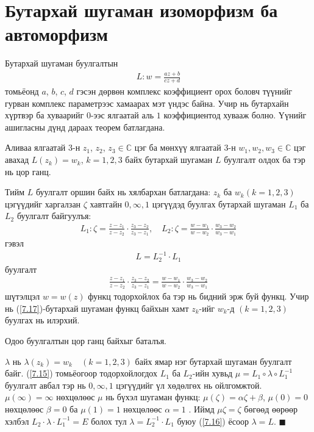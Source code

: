 \section{Бутархай шугаман изоморфизм ба автоморфизм}
Бутархай шугаман буулгалтын
\begin{eqnarray}
L:w=\frac{az+b}{cz+d}
\end{eqnarray}
томьёонд $a$, $b$, $c$, $d$ гэсэн дөрвөн комплекс коэффициент орох боловч түүнийг гурван комплекс параметрээс хамаарах мэт үндэс байна. Учир нь бутархайн хүртвэр ба хуваарийг $0$-ээс ялгаатай аль $1$ коэффициентод хувааж болно. Үүнийг ашигласны дүнд дараах теорем батлагдана.
\begin{thm}
Аливаа ялгаатай $3$-н $z_1$, $z_2$, $z_3\in\mathbb{C}$ цэг ба мөнхүү ялгаатай $3$-н $w_1, w_2, w_3\in\mathbb{C}$ цэг авахад $L(z_k)=w_k$, $k=1,2,3$ байх бутархай шугаман $L$ буулгалт олдох ба тэр нь цор ганц.
\end{thm}
\begin{prf}
Тийм $L$ буулгалт оршин байх нь хялбархан батлагдана: $z_k$ ба $w_k(k=1,2,3)$ цэгүүдийг харгалзан $\zeta$ хавтгайн $0,\infty,1$ цэгүүдэд буулгах бутархай шугаман $L_1$ ба $L_2$ буулгалт байгуулъя:
\begin{eqnarray} \label{7.15}
L_1:\zeta=\frac{z-z_1}{z-z_2}\cdot \frac{z_3-z_2}{z_3-z_1}, \quad
L_2:\zeta=\frac{w-w_1}{w-w_2}\cdot \frac{w_3-w_2}{w_3-w_1}
\end{eqnarray}
гэвэл 
\begin{eqnarray} \label{7.16}
L=L^{-1}_2 \cdot L_1
\end{eqnarray} буулгалт
\begin{eqnarray} \label{7.17}
\frac{z-z_1}{z-z_2}\cdot \frac{z_3-z_2}{z_3-z_1}=\frac{w-w_1}{w-w_2}\cdot \frac{w_3-w_2}{w_3-w_1}
\end{eqnarray}
шүтэлцэл $w=w(z)$ функц тодорхойлох ба тэр нь бидний эрж буй функц. Учир нь (\ref{7.17})-бутархай шугаман функц байхын хамт $z_k$-ийг $w_k$-д $(k=1,2,3)$ буулгах нь илэрхий.

Одоо буулгалтын цор ганц байхыг баталъя.

$\lambda$ нь $\lambda(z_k)=w_k \quad (k=1,2,3)$ байх ямар нэг бутархай шугаман буулгалт байг. (\ref{7.15}) томьёогоор тодорхойлогдох $L_1$ ба $L_2$-ийн хувьд $\mu =L_1\circ \lambda\circ L_1^{-1}$ буулгалт авбал тэр нь $0,\infty, 1$ цэгүүдийг үл хөдөлгөх нь ойлгомжтой. $\mu (\infty)=\infty$ нөхцөлөөс $\mu$ нь бүхэл шугаман функц: $\mu(\zeta)=\alpha\zeta +\beta$, $\mu(0)=0$ нөхцөлөөс $\beta =0$ ба $\mu(1)=1$ нөхцөлөөс $\alpha =1$ . Иймд $\mu\zeta =\zeta$ бөгөөд өөрөөр хэлбэл $L_2\cdot \lambda \cdot L_1^{-1}=E$ болох тул $\lambda =L_2^{-1}\cdot L_1$ буюу (\ref{7.16}) ёсоор $\lambda =L.$
\hfill $\blacksquare$\end{prf}

